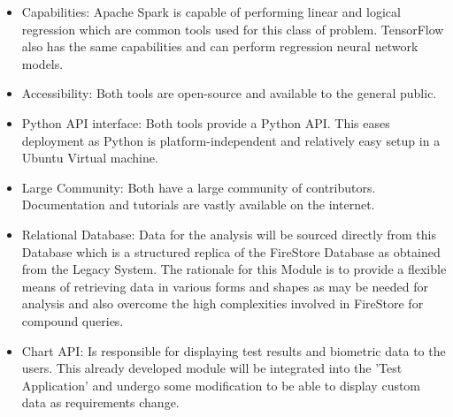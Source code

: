 \begin{itemize}
    \item {Capabilities}: Apache Spark is capable of performing linear and logical regression\cite{apache_spark} which are common tools used for this class of problem. TensorFlow also has the same capabilities and can perform regression neural network models\cite{tensor_flow}.
    \item {Accessibility}: Both tools are open-source and available to the general public\cite{open_source}.
    \item{Python API interface}: Both tools provide a Python API. This eases deployment as Python is platform-independent and relatively easy setup in a Ubuntu Virtual machine.
    \item{Large Community}: Both have a large community of contributors. Documentation and tutorials are vastly available on the internet.
    \item{Relational Database}: Data for the analysis will be sourced directly from this Database which is a structured replica of the FireStore Database as obtained from the Legacy System. The rationale for this Module is to provide a flexible means of retrieving data in various forms and shapes as may be needed for analysis and also overcome the high complexities involved in FireStore for compound queries.
    \item{Chart API}:
    Is responsible for displaying test results and biometric data to the users. This already developed module will be integrated into the 'Test Application' and undergo some modification to be able to display custom data as requirements change. 
    
\end{itemize}